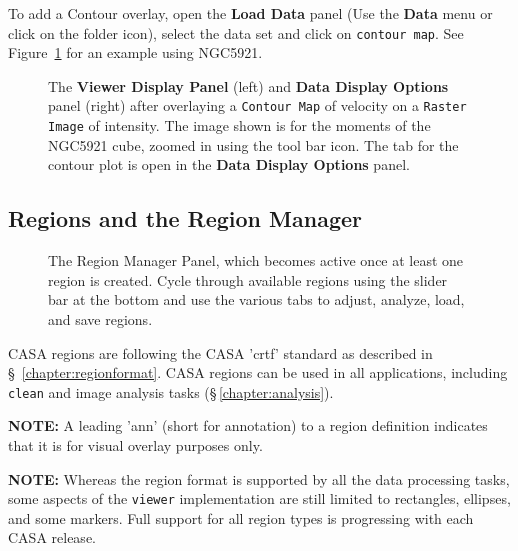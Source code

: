 To add a Contour overlay, open the {\bf Load Data} panel (Use the {\bf Data}
menu or click on the folder icon), select the data set and click on
{\tt contour map}. See Figure~\ref{fig:viewer_rascon} for an example using NGC5921.

\begin{figure}[h!]
\begin{center}
\caption{\label{fig:viewer_rascon} The {\bf Viewer Display Panel}
(left) and {\bf Data Display Options} panel (right) after overlaying
a {\tt Contour Map} of velocity on a {\tt Raster Image} of intensity.  The
image shown is for the moments of the NGC5921 cube, zoomed in using the tool bar icon.
The tab for the contour plot is open in the {\bf Data Display Options} 
panel.} 
\hrulefill
\end{center}
\end{figure}


\subsection{Regions and the Region Manager}
\label{section:display.image.region}

\begin{figure}[h!]
\begin{center}
\caption{\label{fig:viewer_regionpanel} The Region Manager Panel, 
which becomes active once at least one region is created. Cycle through 
available regions using the slider bar at the bottom and use the various tabs
to adjust, analyze, load, and save regions.}
\hrulefill
\end{center}
\end{figure}

CASA regions are following the CASA 'crtf' standard as described in
\S~\ref{chapter:regionformat}. CASA regions can be used in all
applications, including {\tt clean} and image analysis tasks
(\S\,\ref{chapter:analysis}).

{\bf NOTE:} A leading 'ann' (short for annotation) to a
region definition indicates that it is for visual overlay purposes
only.

{\bf NOTE:} Whereas the region format is supported by all the data
processing tasks, some aspects of the {\tt viewer} implementation are still limited
to rectangles, ellipses, and some markers. Full support for all region types
is progressing with each CASA release. 

